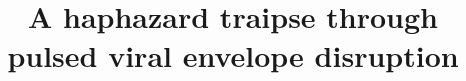 \documentclass[paper.tex]{subfiles}
\begin{document}



\title{A haphazard traipse through pulsed viral envelope disruption}

\date{}


\flushbottom 
\maketitle
\thispagestyle{empty}

\renewcommand{\abstractname}{Summary}    %
\end{document}
